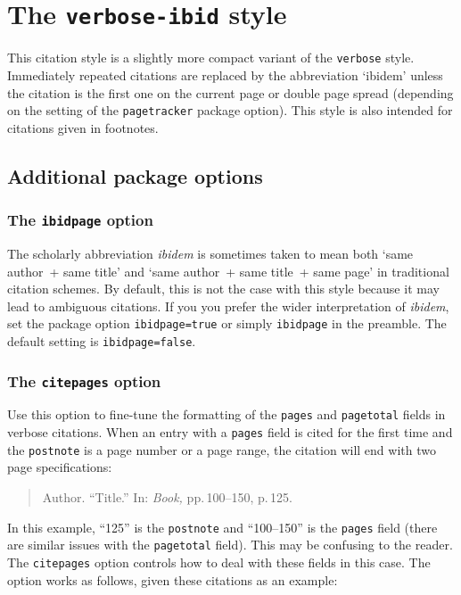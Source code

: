 \documentclass[a4paper]{article}
\begin{document}
\section*{The \texttt{verbose-ibid} style}

This citation style is a slightly more compact variant of the
\texttt{verbose} style. Immediately repeated citations are replaced
by the abbreviation `ibidem' unless the citation is the first one on
the current page or double page spread (depending on the setting of
the \texttt{pagetracker} package option). This style is also
intended for citations given in footnotes.

\subsection*{Additional package options}

\subsubsection*{The \texttt{ibidpage} option}

The scholarly abbreviation \emph{ibidem} is sometimes taken to mean
both `same author~+ same title' and `same author~+ same title~+ same
page' in traditional citation schemes. By default, this is not the
case with this style because it may lead to ambiguous citations. If
you you prefer the wider interpretation of \emph{ibidem}, set the
package option \texttt{ibidpage=true} or simply \texttt{ibidpage} in
the preamble. The default setting is \texttt{ibidpage=false}.

\subsubsection*{The \texttt{citepages} option}

Use this option to fine-tune the formatting of the \texttt{pages}
and \texttt{pagetotal} fields in verbose citations. When an entry
with a \texttt{pages} field is cited for the first time and the
\texttt{postnote} is a page number or a page range, the citation
will end with two page specifications:

\begin{quote}
Author. \enquote{Title.} In: \emph{Book,} pp.\,100--150, p.\,125.
\end{quote}
%
In this example, \enquote{125} is the \texttt{postnote} and
\enquote{100--150} is the \texttt{pages} field (there are similar
issues with the \texttt{pagetotal} field). This may be confusing to
the reader. The \texttt{citepages} option controls how to deal with
these fields in this case. The option works as follows, given these
citations as an example:
\end{document}

